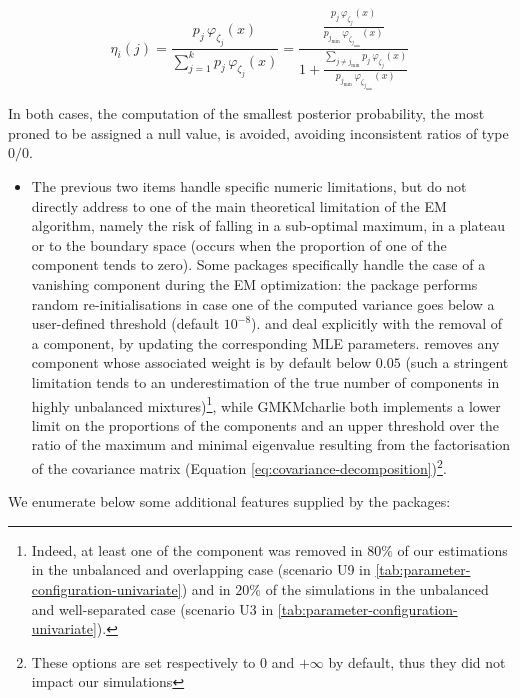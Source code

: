 \begin{equation}
\eta_{i} (j) = \frac{p_{j} \, \varphi_{\zeta_j} (x)}{\sum_{j=1}^k p_{j} \, \varphi_{\zeta_j} (x)}=\frac{\frac{p_{j} \, \varphi_{\zeta_j} (x)}{p_{j_{\min}} \, \varphi_{\zeta_{j_{\min}}} (x)}}{1+ \frac{\sum_{j\neq j_{\min}} p_{j} \, \varphi_{\zeta_j} (x)}{p_{j_{\min}} \, \varphi_{\zeta_{j_{\min}}} (x)}}
    \label{eq:trick-underflow}
\end{equation}

In both cases, the computation of the smallest posterior probability, the most
proned to be assigned a null value, is avoided, avoiding inconsistent ratios of type \(0/0\).

\begin{itemize}
\tightlist
\item
  The previous two items handle specific numeric limitations, but do not directly address to one of the main theoretical limitation of the EM algorithm, namely the risk of falling in a sub-optimal maximum, in a plateau or to the boundary space (occurs when the proportion of one of the component tends to zero). Some packages specifically handle the case of a vanishing component during the EM optimization: the  package performs random re-initialisations in case one of the computed variance goes below a user-defined threshold (default \(10^{-8}\)).  and  deal explicitly with the removal of a component, by updating the corresponding MLE parameters.  removes any component whose associated weight is by default below \(0.05\) (such a stringent limitation tends to an underestimation of the true number of components in highly unbalanced mixtures)\footnote{Indeed, at least one of the component was removed in \(80\%\) of our estimations in the unbalanced and overlapping case (scenario U9 in \ref{tab:parameter-configuration-univariate}) and in \(20\%\) of the simulations in the unbalanced and well-separated case (scenario U3 in \ref{tab:parameter-configuration-univariate}).}, while GMKMcharlie both implements a lower limit on the proportions of the components and an upper threshold over the ratio of the maximum and minimal eigenvalue resulting from the factorisation of the covariance matrix (Equation \eqref{eq:covariance-decomposition})\footnote{These options are set respectively to 0 and \(+\infty\) by default, thus they did not impact our simulations}.
\end{itemize}

We enumerate below some additional features supplied by the packages:

